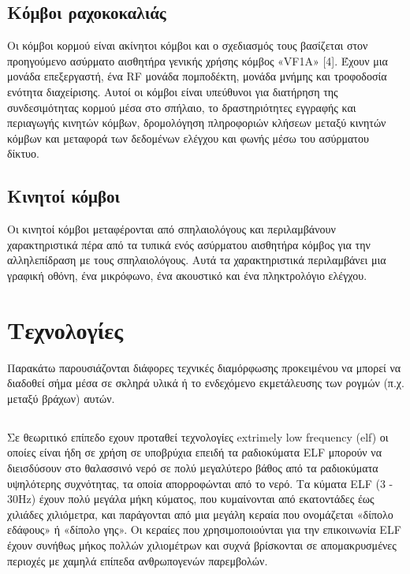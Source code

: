 \documentclass[12pt]{article}
\begin{document}
\begin{multicols*}{2}
    \subsection{\small \textsf{Κόμβοι ραχοκοκαλιάς}} Οι κόμβοι κορμού είναι ακίνητοι
        κόμβοι και ο σχεδιασμός τους βασίζεται στον προηγούμενο ασύρματο αισθητήρα γενικής
        χρήσης κόμβος «VF1A» [4]. Έχουν μια μονάδα επεξεργαστή, ένα RF μονάδα πομποδέκτη,
        μονάδα μνήμης και τροφοδοσία ενότητα διαχείρισης. Αυτοί οι κόμβοι είναι υπεύθυνοι
        για διατήρηση της συνδεσιμότητας κορμού μέσα στο σπήλαιο, το δραστηριότητες
        εγγραφής και περιαγωγής κινητών κόμβων, δρομολόγηση πληροφοριών κλήσεων μεταξύ
        κινητών κόμβων και μεταφορά των δεδομένων ελέγχου και φωνής μέσω του ασύρματου
        δίκτυο.
    
        \subsection{\small \textsf{Κινητοί κόμβοι}}  Οι κινητοί κόμβοι μεταφέρονται από
        σπηλαιολόγους και περιλαμβάνουν χαρακτηριστικά πέρα από τα τυπικά ενός ασύρματου
        αισθητήρα κόμβος για την αλληλεπίδραση με τους σπηλαιολόγους. Αυτά τα
        χαρακτηριστικά περιλαμβάνει μια γραφική οθόνη, ένα μικρόφωνο, ένα ακουστικό και
        ένα πληκτρολόγιο ελέγχου.

    \section{\normalsize  \textsf{Τεχνολογίες}} Παρακάτω παρουσιάζονται διάφορες τεχνικές
    διαμόρφωσης προκειμένου να μπορεί να διαδοθεί σήμα μέσα σε σκληρά υλικά ή το
    ενδεχόμενο εκμετάλευσης των ρογμών (π.χ. μεταξύ βράχων) αυτών.

    \subsection{} Σε θεωριτικό επίπεδο εχουν προταθεί τεχνολογίες extrimely low frequency
    (elf) οι οποίες είναι ήδη σε χρήση σε υποβρύχια επειδή τα ραδιοκύματα ELF μπορούν να
    διεισδύσουν στο θαλασσινό νερό σε πολύ μεγαλύτερο βάθος από τα ραδιοκύματα υψηλότερης
    συχνότητας, τα οποία απορροφώνται από το νερό. Τα κύματα ELF (3 - 30Hz) έχουν πολύ
    μεγάλα μήκη κύματος, που κυμαίνονται από εκατοντάδες έως χιλιάδες χιλιόμετρα, και
    παράγονται από μια μεγάλη κεραία που ονομάζεται «δίπολο εδάφους» ή «δίπολο γης». Οι
    κεραίες που χρησιμοποιούνται για την επικοινωνία ELF έχουν συνήθως μήκος πολλών
    χιλιομέτρων και συχνά βρίσκονται σε απομακρυσμένες περιοχές με χαμηλά επίπεδα
    ανθρωπογενών παρεμβολών.


\end{multicols*}
\end{document}
